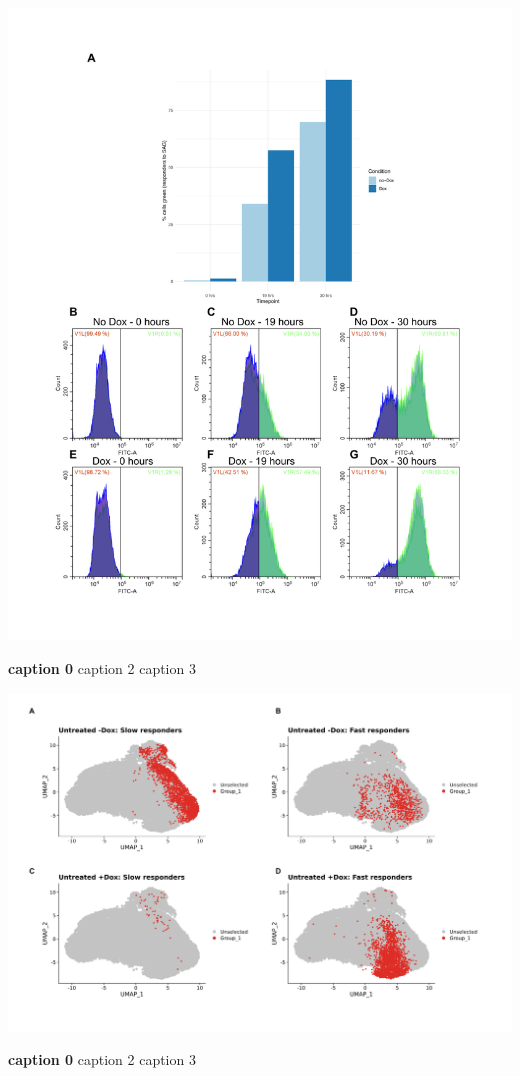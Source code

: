 \begin{suppfigure}[p]  
    \centering
    \includegraphics[width=\linewidth]{figures/hedgehog/SuppFigure20.png}
    \caption[caption1]{
        \textbf{caption 0}
        caption 2
        caption 3   
    }
    \label{fig:hh_figureS20}
\end{suppfigure}


\begin{suppfigure}[p]  
    \centering
    \includegraphics[width=\linewidth]{figures/hedgehog/SuppFigure21.png}
    \caption[caption1]{
        \textbf{caption 0}
        caption 2
        caption 3   
    }
    \label{fig:hh_figureS21}
\end{suppfigure}

